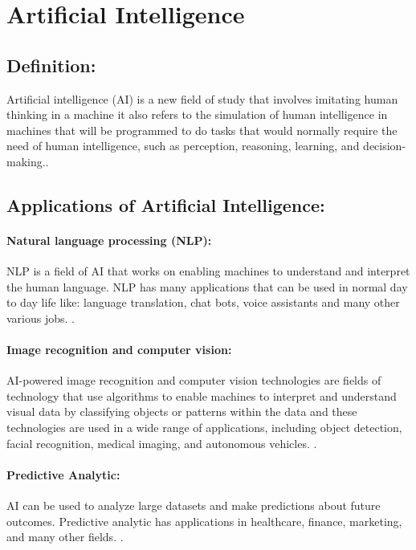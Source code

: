 







\section{Artificial Intelligence}

	\subsection{Definition:}
	Artificial intelligence (AI) is a new field of study that involves imitating human thinking in a machine it also refers to the simulation of human intelligence in machines that will be programmed to do tasks that would normally require the need of human intelligence, such as perception, reasoning, learning, and decision-making.\cite{russell2010artificial}.

	\subsection{Applications of Artificial Intelligence:}
		\paragraph{Natural language processing (NLP):}
		NLP is a field of AI that works on enabling machines to understand and interpret  the human language. NLP has many applications that can be used in normal day to day life like: language translation, chat bots, voice assistants and many other various jobs. \cite{christopher1999foundations}.

		\paragraph{Image recognition and computer vision:}
		AI-powered image recognition and computer vision technologies are  fields of technology that use algorithms to enable machines to interpret and understand visual data by classifying objects or patterns within the data and these technologies are used in a wide range of applications, including object detection, facial recognition, medical imaging, and autonomous vehicles. \cite{bishop2006pattern}.

		\paragraph{Predictive Analytic:}
		AI can be used to analyze large datasets and make predictions about future outcomes. Predictive analytic has applications in healthcare, finance, marketing, and many other fields. \cite{shmueli2010explain}.
	

